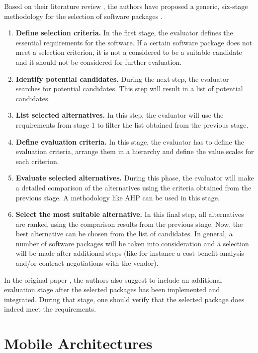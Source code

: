 Based on their literature review \cite{Jadhav:2009}, the authors have proposed a generic, six-stage methodology for the selection of software packages \cite{Jadhav:2011}.

\begin{enumerate}
    \item \textbf{Define selection criteria.} In the first stage, the evaluator defines the essential requirements for the software. If a certain software package does not meet a selection criterion, it is not a considered to be a suitable candidate and it should not be considered for further evaluation. 
    \item \textbf{Identify potential candidates.} During the next step, the evaluator searches for potential candidates. This step will result in a list of potential candidates.
    \item \textbf{List selected alternatives.} In this step, the evaluator will use the requirements from stage 1 to filter the list obtained from the previous stage. 
    \item \textbf{Define evaluation criteria.} In this stage, the evaluator has to define the evaluation criteria, arrange them in a hierarchy and define the value scales for each criterion. 
    \item \textbf{Evaluate selected alternatives.} During this phase, the evaluator will make a detailed comparison of the alternatives using the criteria obtained from the previous stage. A methodology like AHP can be used in this stage.
    \item \textbf{Select the most suitable alternative.} In this final step, all alternatives are ranked using the comparison results from the previous stage. Now, the best alternative can be chosen from the list of candidates. In general, a number of software packages will be taken into consideration and a selection will be made after additional steps (like for instance a cost-benefit analysis and/or contract negotiations with the vendor). 
\end{enumerate}

In the original paper \cite{Jadhav:2009}, the authors also suggest to include an additional evaluation stage after the selected packages has been implemented and integrated. During that stage, one should verify that the selected package does indeed meet the requirements.

\section{Mobile Architectures}

